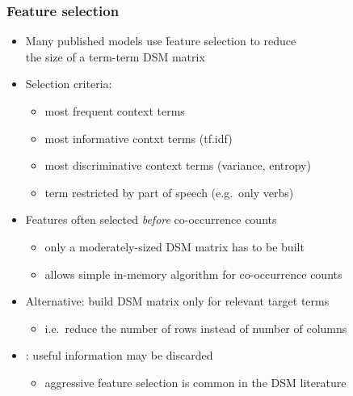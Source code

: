\begin{frame}
  \frametitle{Feature selection}

  \begin{itemize}
  \item Many published models use \h{feature selection} to reduce\\
    the size of a term-term DSM matrix%
    \pause
  \item Selection criteria:
    \begin{itemize}
    \item most frequent context terms
    \item most informative contxt terms (tf.idf)
    \item most discriminative context terms (variance, entropy)
    \item term restricted by part of speech (e.g.\ only verbs)
    \end{itemize}
    \pause
  \item Features often selected \emph{before} co-occurrence counts
    \begin{itemize}
    \item only a moderately-sized DSM matrix has to be built
    \item allows simple in-memory algorithm for co-occurrence counts
    \end{itemize}
    \pause
  \item Alternative: build DSM matrix only for relevant target terms
    \begin{itemize}
    \item i.e.\ reduce the number of rows instead of number of columns
    \end{itemize}
    \pause
  \item {}: useful information may be discarded
    \begin{itemize}
    \item aggressive feature selection is common in the DSM literature
    \end{itemize}
  \end{itemize}
\end{frame}

